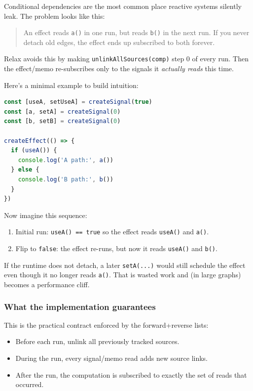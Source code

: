Conditional dependencies are the most common place reactive systems silently leak.
The problem looks like this:

\begin{quote}
An effect reads \texttt{a()} in one run, but reads \texttt{b()} in the next run. If you never detach old edges, the effect ends up subscribed to both forever.
\end{quote}

Relax avoids this by making \texttt{unlinkAllSources(comp)} step 0 of every run.
Then the effect/memo re-subscribes only to the signals it \emph{actually reads} this time.

Here's a minimal example to build intuition:

\begin{lstlisting}[language=JavaScript]
const [useA, setUseA] = createSignal(true)
const [a, setA] = createSignal(0)
const [b, setB] = createSignal(0)

createEffect(() => {
  if (useA()) {
    console.log('A path:', a())
  } else {
    console.log('B path:', b())
  }
})
\end{lstlisting}

Now imagine this sequence:

\begin{enumerate}
  \item Initial run: \texttt{useA() == true} so the effect reads \texttt{useA()} and \texttt{a()}.
  \item Flip to \texttt{false}: the effect re-runs, but now it reads \texttt{useA()} and \texttt{b()}.
\end{enumerate}

If the runtime does not detach, a later \texttt{setA(...)} would still schedule the effect even though it no longer reads \texttt{a()}.
That is wasted work and (in large graphs) becomes a performance cliff.

\subsubsection{What the implementation guarantees}

This is the practical contract enforced by the forward+reverse lists:

\begin{itemize}
  \item Before each run, unlink all previously tracked sources.
  \item During the run, every signal/memo read adds new source links.
  \item After the run, the computation is subscribed to exactly the set of reads that occurred.
\end{itemize}

